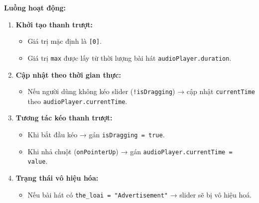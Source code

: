 \textbf{Luồng hoạt động:}
\begin{enumerate}
  \item \textbf{Khởi tạo thanh trượt:}
  \begin{itemize}
    \item Giá trị mặc định là \texttt{[0]}.
    \item Giá trị \texttt{max} được lấy từ thời lượng bài hát \texttt{audioPlayer.duration}.
  \end{itemize}

  \item \textbf{Cập nhật theo thời gian thực:}
  \begin{itemize}
    \item Nếu người dùng không kéo slider (\texttt{!isDragging}) → cập nhật \texttt{currentTime} theo \texttt{audioPlayer.currentTime}.
  \end{itemize}

  \item \textbf{Tương tác kéo thanh trượt:}
  \begin{itemize}
    \item Khi bắt đầu kéo → gán \texttt{isDragging = true}.
    \item Khi nhả chuột (\texttt{onPointerUp}) → gán \texttt{audioPlayer.currentTime = value}.
  \end{itemize}

  \item \textbf{Trạng thái vô hiệu hóa:}
  \begin{itemize}
    \item Nếu bài hát có \texttt{the\_loai = "Advertisement"} → slider sẽ bị vô hiệu hoá.
  \end{itemize}
\end{enumerate}

